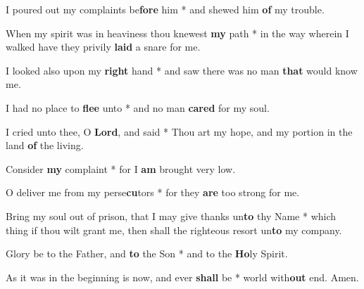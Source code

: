 \begin{multicols}{2}
	I poured out my complaints be\textbf{fore} him * and shewed him \textbf{of} my trouble.
	
	When my spirit was in heaviness thou knewest \textbf{my} path * in the way wherein I walked have they privily \textbf{laid} a snare for me.
	
	I looked also upon my \textbf{right} hand * and saw there was no man \textbf{that} would know me.
	
	I had no place to \textbf{flee} unto * and no man \textbf{cared} for my soul.
	
	I cried unto thee, O \textbf{Lord}, and said * Thou art my hope, and my portion in the land \textbf{of} the living.
	
	Consider \textbf{my} complaint * for I \textbf{am} brought very low.
	
	O deliver me from my perse\textbf{cu}tors * for they \textbf{are} too strong for me.
	
	Bring my soul out of prison, that I may give thanks un\textbf{to} thy Name * which thing if thou wilt grant me, then shall the righteous resort un\textbf{to} my company.
	
	Glory be to the Father, and \textbf{to} the Son * and to the \textbf{Ho}ly Spirit.
	
	As it was in the beginning is now, and ever \textbf{shall} be * world with\textbf{out} end. Amen.
\end{multicols}